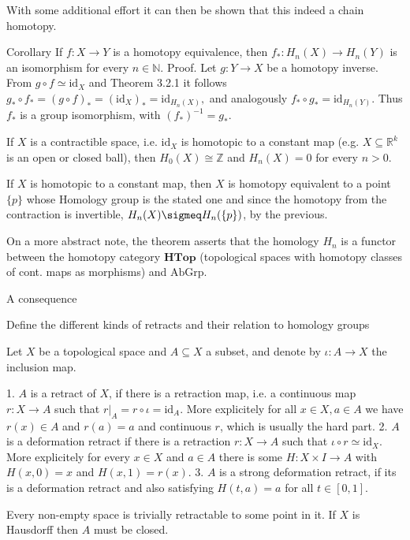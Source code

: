 With some additional effort it can then be shown that this indeed a chain homotopy.

Corollary
If \(f: X \to Y\) is a homotopy equivalence, then \(f_*: H_n(X) \to H_n(Y)\) is an isomorphism for every \(n \in \mathbb{N}\).
Proof. Let \(g: Y \to X\) be a homotopy inverse. From \(g \circ f \simeq \text{id}_X\) and Theorem 3.2.1 it follows
\(g_* \circ f_* = (g \circ f)_* = (\text{id}_X)_* = \text{id}_{H_n(X)},\)
and analogously \(f_* \circ g_* = \text{id}_{H_n(Y)}\). Thus \(f_*\) is a group isomorphism, with \((f_*)^{-1} = g_*\).

If \(X\) is a contractible space, i.e. \(\text{id}_X\) is homotopic to a constant map (e.g. \(X \subseteq \mathbb{R}^k\) is an open or closed ball), then \(H_0(X) \cong \mathbb{Z}\) and \(H_n(X) = 0\) for every \(n > 0\).

If \(X\) is homotopic to a constant map, then \(X\) is homotopy equivalent to a point \(\{p\}\) whose Homology group is the stated one and since the homotopy
from the contraction is invertible, \( H_n(X) \sigmeq H_n(\{p\})\), by the previous.

On a more abstract note, the theorem asserts that the homology \( H_n \) is a functor between the homotopy category \( \textbf{HTop} \) 
(topological spaces with homotopy classes of cont. maps as morphisms) and \( \text{AbGrp} \).

A consequence

Define the different kinds of retracts and their relation to homology groups

Let \(X\) be a topological space and \(A \subseteq X\) a subset, and denote by \(\iota : A \to X\) the inclusion map. 

1. \(A\) is a retract of \(X\), if there is a retraction map, i.e. a continuous map \(r: X \to A\) such that \(r|_A = r \circ \iota = \text{id}_A\).
More explicitely for all \( x \in X, a \in A\) we have \( r(x) \in A \) and \( r(a) = a \) and continuous \( r \), which is usually the hard part.
2. \(A\) is a deformation retract if there is a retraction \(r: X \to A\) such that \(\iota \circ r \simeq \text{id}_X\).
More explicitely for every \( x \in X \) and \( a \in A \) there is some \( H : X \times I \to A \) with \( H(x, 0) = x \) and \( H(x, 1) = r(x) \).
3. \(A\) is a strong deformation retract, if its is a deformation retract and also satisfying \( H(t, a) = a \) for all \( t \in [0, 1] \).

Every non-empty space is trivially retractable to some point in it.
If \( X \) is Hausdorff then \( A \) must be closed.

